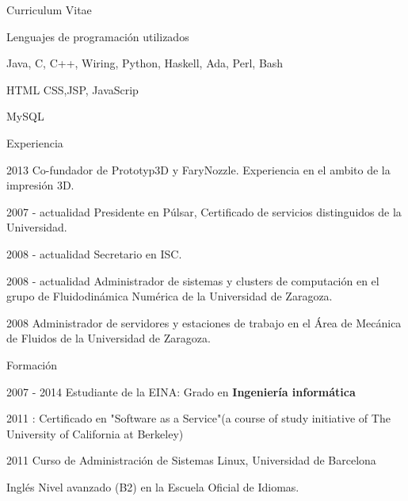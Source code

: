 \begin{cv}{Curriculum Vitae}

\begin{cvlist}{Lenguajes de programación utilizados}
\item Java, C, C++, Wiring, Python, Haskell, Ada, Perl, Bash
\item HTML CSS,JSP, JavaScrip
\item MySQL
\end{cvlist}

\begin{cvlist}{Experiencia}

	\item[2013] Co-fundador de Prototyp3D y FaryNozzle. Experiencia en el ambito de la impresión 3D.
	\item[2007 - actualidad] Presidente en Púlsar, Certificado de servicios distinguidos de la Universidad.
	\item[2008 - actualidad] Secretario en ISC.
	\item[2008 - actualidad] Administrador de sistemas y clusters de computación en el grupo de Fluidodinámica Numérica de la Universidad de Zaragoza.
	\item[2008] Administrador de servidores y estaciones de trabajo en el Área de Mecánica de Fluidos de la Universidad de Zaragoza.

\end{cvlist}

\begin{cvlist}{Formación}

	\item[2007 - 2014] Estudiante de la EINA: Grado en \textbf{Ingeniería informática}
	\item[2011]: Certificado en "Software as a Service"(a course of study initiative of The University of California at Berkeley) 
	\item [2011] Curso de Administración de Sistemas Linux, Universidad de Barcelona
	\item [Inglés] Nivel avanzado (B2) en la Escuela Oficial de Idiomas.

\end{cvlist}

\end{cv}